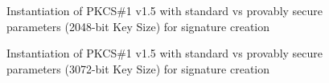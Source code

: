 \documentclass[]{final_report}
\theoremstyle{definition}
\begin{document}
\begin{figure}[H]
    \centering %
     \caption{Instantiation of PKCS\#1 v1.5 with standard vs provably secure parameters (2048-bit Key Size) for signature creation}
    \begin{minipage}{\textwidth}
        \centering
    \end{minipage}
            \label{pkcs_sign_2048bit_table}
  \end{figure}
  
\begin{figure}[H]
    \centering %
     \caption{Instantiation of PKCS\#1 v1.5 with standard vs provably secure parameters (3072-bit Key Size) for signature creation}
    \begin{minipage}{\textwidth}
        \centering
    \end{minipage}
         \label{pkcs_sign_3072bit_table}
\end{figure}
\end{document}
